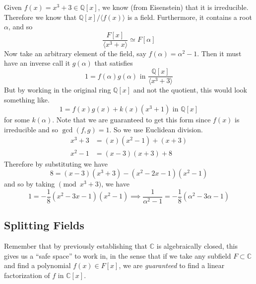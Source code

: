   \begin{example} 
    Given $f(x) = x^3 + 3 \in \mathbb{Q}[x]$, we know (from Eisenstein) that it is irreducible. Therefore we know that $\mathbb{Q}[x]/\langle f(x) \rangle$ is a field. Furthermore, it contains a root $\alpha$, and so 
    \begin{equation}
      \frac{F[x]}{\langle x^3 + x \rangle} \simeq F[\alpha]
    \end{equation}
    Now take an arbitrary element of the field, say $f(\alpha) = \alpha^2 - 1$. Then it must have an inverse call it $g(\alpha)$ that satisfies 
    \begin{equation}
      1 = f(\alpha) g(\alpha) \text{ in } \frac{\mathbb{Q}[x]}{\langle x^3 + 3 \rangle}
    \end{equation}
    But by working in the original ring $\mathbb{Q}[x]$ and not the quotient, this would look something like. 
    \begin{equation}
      1 = f(x) g(x) + k(x) (x^3 + 1) \text{ in } \mathbb{Q}[x]
    \end{equation} 
    for some $k(\alpha)$. Note that we are guaranteed to get this form since $f(x)$ is irreducible and so $\gcd(f, g) = 1$. So we use Euclidean division. 
    \begin{align}
      x^3 + 3 & = (x) (x^2 - 1) + (x + 3) \label{hi}\\
      x^2 - 1 & = (x - 3) (x + 3) + 8
    \end{align}
    Therefore by substituting we have 
    \begin{equation}
      8 = (x - 3) (x^3 + 3) - (x^2 - 2x - 1) (x^2 - 1) 
    \end{equation} 
    and so by taking $\pmod{x^3 + 3}$, we have 
    \begin{equation}
      1 = -\frac{1}{8} (x^2 - 3x - 1) (x^2 - 1) \implies \frac{1}{\alpha^2 - 1} = -\frac{1}{8}(\alpha^2 - 3 \alpha - 1)
    \end{equation}
  \end{example}

\subsection{Splitting Fields} 

  Remember that by previously establishing that $\mathbb{C}$ is algebraically closed, this gives us a ``safe space'' to work in, in the sense that if we take any subfield $F \subset \mathbb{C}$ and find a polynomial $f(x) \in F[x]$, we are \textit{guaranteed} to find a linear factorization of $f$ in $\mathbb{C}[x]$. 

